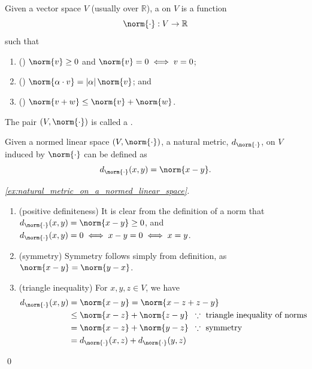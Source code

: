 \documentclass[notoc,notitlepage]{tufte-book}
\begin{document}
\begin{defn}\label{defn:norm_n_normed_linear_space}
  Given a vector space $V$ (usually over $\mathbb{R}$), a  on $V$ is a function
  \begin{equation*}
    \norm{\cdot} : V \to \mathbb{R}
  \end{equation*}
  such that
  \begin{enumerate}
    \item () $\norm{v} \geq 0$ and $\norm{v} = 0 \iff v = 0$;
    \item () $\norm{\alpha \cdot v} = \abs{\alpha} \norm{v}$; and
    \item () $\norm{v + w} \leq \norm{v} + \norm{w}$.
  \end{enumerate}
  The pair $(V, \norm{\cdot})$ is called a .
\end{defn}

\begin{remark}
  Given a normed linear space $(V, \norm{\cdot})$, a natural metric, $d_{\norm{\cdot}}$, on $V$ induced by $\norm{\cdot}$ can be defined as
  \begin{equation*}
    d_{\norm{\cdot}} (x, y) = \norm{x - y}.
  \end{equation*}
\end{remark}

\begin{proof}[\cref{ex:natural_metric_on_a_normed_linear_space}]
  \begin{enumerate}
    \item (positive definiteness) It is clear from the definition of a norm that $d_{\norm{\cdot}}(x, y) = \norm{x - y} \geq 0$, and $d_{\norm{\cdot}}(x, y) = 0 \iff x - y = 0 \iff x = y$.
    \item (symmetry) Symmetry follows simply from definition, as $\norm{x - y} = \norm{y - x}$.
    \item (triangle inequality) For $x, y, z \in V$, we have
      \begin{align*}
        d_{\norm{\cdot}} (x, y) &= \norm{x - y} = \norm{ x - z + z - y } \\
                                &\leq \norm{x - z} + \norm{ z - y } \enspace \because \text{ triangle inequality of norms } \\
                                &= \norm{x - z} + \norm{ y - z } \enspace \because \text{ symmetry } \\
                                &= d_{\norm{\cdot}}(x, z) + d_{\norm{\cdot}}(y, z)
      \end{align*}
  \end{enumerate}\qed
\end{proof}
\end{document}
